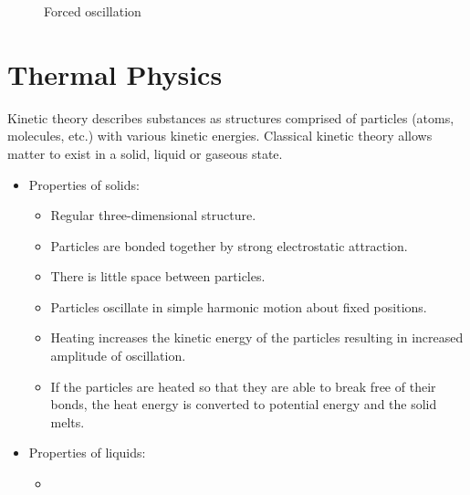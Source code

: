 \documentclass[a4,8pt]{article}
\begin{document}
\begin{figure}[h]
\begin{center}
\end{center}
\caption{Forced oscillation}
\end{figure}

\section{Thermal Physics}
Kinetic theory describes substances as structures comprised of particles (atoms, molecules, etc.) with various kinetic energies. Classical kinetic theory allows matter to exist in a solid, liquid or gaseous state.

\begin{itemize}
	\item Properties of solids:
		\begin{itemize}
			\item Regular three-dimensional structure.
			\item Particles are bonded together by strong electrostatic attraction.
			\item There is little space between particles.
			\item Particles oscillate in simple harmonic motion about fixed positions.
			\item Heating increases the kinetic energy of the particles resulting in increased amplitude of oscillation.
			\item If the particles are heated so that they are able to break free of their bonds, the heat energy is converted to potential energy and the solid melts.
		\end{itemize}
	\item Properties of liquids:
		\begin{itemize}
			\item
		\end{itemize}
\end{itemize}
\end{document}
